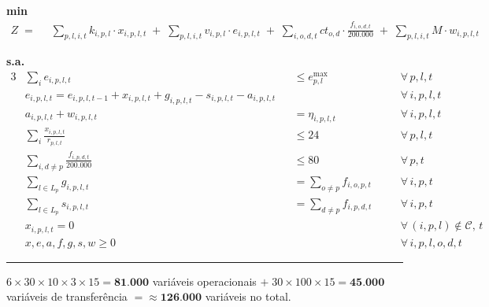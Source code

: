 \documentclass[12pt, a4paper]{article}
\begin{document}
\begin{mdframed}[backgroundcolor=blue!5, linecolor=ballblue, linewidth=2pt,
  innertopmargin=14pt, innerbottommargin=14pt,
  innerleftmargin=14pt, innerrightmargin=14pt]

\textbf{\color{ballblue}min}
\[
  \begin{aligned}
    Z \;=\;\;
    & \sum_{p,l,i,t} k_{i,p,l} \cdot x_{i,p,l,t}
      \;+\; \sum_{p,l,i,t} v_{i,p,l} \cdot e_{i,p,l,t}
      \;+\; \sum_{i,o,d,t} ct_{o,d} \cdot \tfrac{f_{i,o,d,t}}{200{.}000}
      \;+\; \sum_{p,l,i,t} M \cdot w_{i,p,l,t}
  \end{aligned}
\]

\textbf{\color{ballblue}s.a.}
\begin{alignat}{3}
  &\textstyle\sum_{i} e_{i,p,l,t}
    &&\leq e^{\max}_{p,l}
    &&\quad\forall\,p,l,t \tag{R1}\\[6pt]
  &e_{i,p,l,t} = e_{i,p,l,t-1} + x_{i,p,l,t} + g_{i,p,l,t} - s_{i,p,l,t} - a_{i,p,l,t}
    &&
    &&\quad\forall\,i,p,l,t \tag{R2}\\[6pt]
  &a_{i,p,l,t} + w_{i,p,l,t}
    &&= \eta_{i,p,l,t}
    &&\quad\forall\,i,p,l,t \tag{R3}\\[6pt]
  &\textstyle\sum_{i} \tfrac{x_{i,p,l,t}}{r_{p,l,t}}
    &&\leq 24
    &&\quad\forall\,p,l,t \tag{R4}\\[6pt]
  &\textstyle\sum_{i,d\neq p} \tfrac{f_{i,p,d,t}}{200{.}000}
    &&\leq 80
    &&\quad\forall\,p,t \tag{R5}\\[6pt]
  &\textstyle\sum_{l \in L_p} g_{i,p,l,t}
    &&= \textstyle\sum_{o \neq p} f_{i,o,p,t}
    &&\quad\forall\,i,p,t \tag{R6}\\[6pt]
  &\textstyle\sum_{l \in L_p} s_{i,p,l,t}
    &&= \textstyle\sum_{d \neq p} f_{i,p,d,t}
    &&\quad\forall\,i,p,t \tag{R7}\\[6pt]
  &x_{i,p,l,t} = 0
    &&
    &&\quad\forall\,(i,p,l)\notin\mathcal{C},\,t \tag{R8}\\[6pt]
  &x,e,a,f,g,s,w \geq 0
    &&
    &&\quad\forall\,i,p,l,o,d,t \tag{R9}
\end{alignat}
\end{mdframed}

\vspace{8pt}
{\color{accentgray}\rule{\linewidth}{0.5pt}}
\begin{center}
  \small\color{darkgray}
  $6 \times 30 \times 10 \times 3 \times 15 = \mathbf{81{.}000}$ vari\'{a}veis operacionais
  $+\; 30 \times 100 \times 15 = \mathbf{45{.}000}$ vari\'{a}veis de transfer\^{e}ncia
  $= \approx \mathbf{126{.}000}$ vari\'{a}veis no total.
\end{center}
\end{document}
